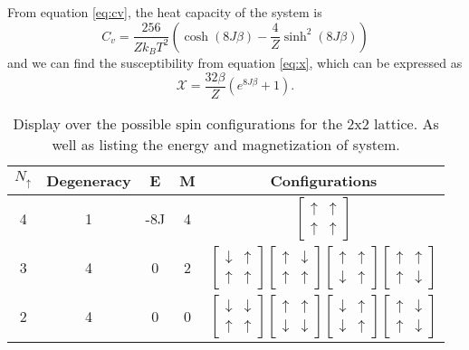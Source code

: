 \documentclass[%
reprint,
nofootinbib,
amsmath,amssymb,
aps,
]{revtex4-1}
\begin{document}
From equation \eqref{eq:cv}, the heat capacity of the system is 
\begin{equation}
	C_v = \frac{256}{Zk_BT^2}\left( \cosh(8J\beta) - \frac{4}{Z}\sinh^2(8J\beta)\right)
\end{equation}
and we can find the susceptibility from equation \eqref{eq:x}, which can be expressed as 
\begin{equation}
	\mathcal{X} = \frac{32\beta}{Z}\left(e^{8J\beta} +1\right).
\end{equation}
\begin{table}
	\vspace{10pt}
	\caption{Display over the possible spin configurations for the 2x2 lattice. As well as listing the energy and magnetization of system.}
	\label{tab:2x2}
\begin{tabular}{|c|c|c|c|c|}
	\hline 
	$N_\uparrow$ & Degeneracy & E  & M & Configurations\\
	\hline
	4 & 1 & -8J & 4 & $\begin{bmatrix}\uparrow & \uparrow \\ \uparrow&\uparrow\end{bmatrix}$\\
	3 & 4 & 0 & 2 & $\begin{bmatrix}\downarrow & \uparrow \\ \uparrow&\uparrow\end{bmatrix}\begin{bmatrix}\uparrow & \downarrow \\ \uparrow&\uparrow\end{bmatrix}\begin{bmatrix}\uparrow & \uparrow \\ \downarrow&\uparrow\end{bmatrix}\begin{bmatrix}\uparrow & \uparrow \\ \uparrow&\downarrow\end{bmatrix}$\\
	2 & 4 & 0 & 0 &$\begin{bmatrix}\downarrow & \downarrow \\ \uparrow&\uparrow\end{bmatrix}\begin{bmatrix}\uparrow & \uparrow \\ \downarrow&\downarrow\end{bmatrix}\begin{bmatrix}\downarrow & \uparrow \\ \downarrow&\uparrow\end{bmatrix}\begin{bmatrix}\uparrow & \downarrow \\ \uparrow&\downarrow\end{bmatrix}$\\

\end{tabular}
\end{table}
\end{document}
